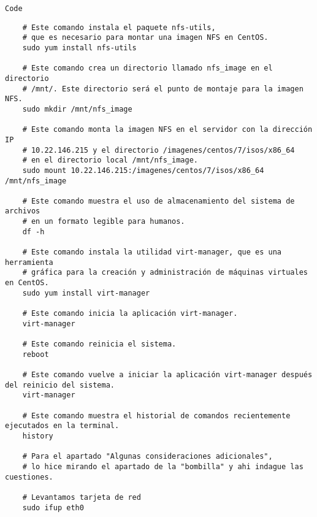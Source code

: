\item \verb|Code|
    \begin{verbatim}
    # Este comando instala el paquete nfs-utils,
    # que es necesario para montar una imagen NFS en CentOS.
    sudo yum install nfs-utils
    
    # Este comando crea un directorio llamado nfs_image en el directorio
    # /mnt/. Este directorio será el punto de montaje para la imagen NFS.
    sudo mkdir /mnt/nfs_image
    
    # Este comando monta la imagen NFS en el servidor con la dirección IP
    # 10.22.146.215 y el directorio /imagenes/centos/7/isos/x86_64
    # en el directorio local /mnt/nfs_image.
    sudo mount 10.22.146.215:/imagenes/centos/7/isos/x86_64 /mnt/nfs_image 
    
    # Este comando muestra el uso de almacenamiento del sistema de archivos
    # en un formato legible para humanos.
    df -h
    
    # Este comando instala la utilidad virt-manager, que es una herramienta
    # gráfica para la creación y administración de máquinas virtuales en CentOS.
    sudo yum install virt-manager 
    
    # Este comando inicia la aplicación virt-manager.
    virt-manager
    
    # Este comando reinicia el sistema.
    reboot
    
    # Este comando vuelve a iniciar la aplicación virt-manager después del reinicio del sistema.
    virt-manager
    
    # Este comando muestra el historial de comandos recientemente ejecutados en la terminal.
    history
    
    # Para el apartado "Algunas consideraciones adicionales",
    # lo hice mirando el apartado de la "bombilla" y ahi indague las cuestiones.

    # Levantamos tarjeta de red
    sudo ifup eth0
    \end{verbatim}